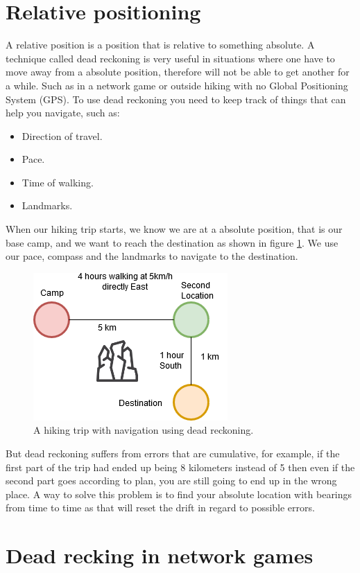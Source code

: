 \section{Relative positioning}

A relative position is a position that is relative to something absolute. A technique called dead reckoning is very useful in situations where one have to move away from a absolute position, therefore will not be able to get another for a while. Such as in a network game or outside hiking with no Global Positioning System (GPS). To use dead reckoning you need to keep track of things that can help you navigate, such as:

\begin{itemize}
\item Direction of travel.
\item Pace.
\item Time of walking.
\item Landmarks.
\end{itemize}

When our hiking trip starts, we know we are at a absolute position, that is our base camp, and we want to reach the destination as shown in figure \ref{fig:deadrecdrawing}. We use our pace, compass and the landmarks to navigate to the destination.

\begin{figure}[H]
	\centering
	\includegraphics[width=0.4\linewidth]{positioning/positioning/deadRecDrawing}
	\caption{A hiking trip with navigation using dead reckoning.}
	\label{fig:deadrecdrawing}
\end{figure}

But dead reckoning suffers from errors that are cumulative, for example, if the first part of the trip had ended up being 8 kilometers instead of 5 then even if the second part goes according to plan, you are still going to end up in the wrong place. A way to solve this problem is to find your absolute location with bearings from time to time as that will reset the drift in regard to possible errors.

\section{Dead recking in network games}

